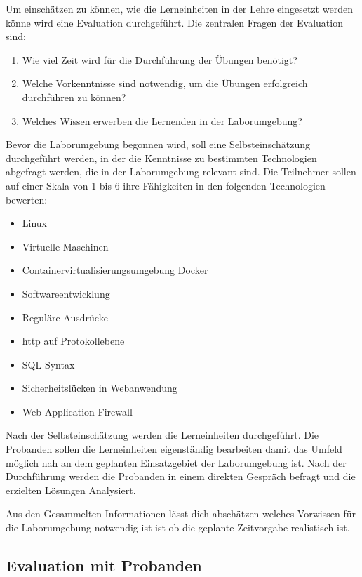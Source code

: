 Um einschätzen zu können, wie die Lerneinheiten in der Lehre eingesetzt werden könne wird eine Evaluation durchgeführt.
Die zentralen Fragen der Evaluation sind:
\begin{enumerate}
    \item Wie viel Zeit wird für die Durchführung der Übungen benötigt?
    \item Welche Vorkenntnisse sind notwendig, um die Übungen erfolgreich durchführen zu können?
    \item Welches Wissen erwerben die Lernenden in der Laborumgebung?
\end{enumerate}

Bevor die Laborumgebung begonnen wird, soll eine Selbsteinschätzung durchgeführt werden, in der die Kenntnisse zu bestimmten Technologien abgefragt werden, die in der Laborumgebung relevant sind.
Die Teilnehmer sollen auf einer Skala von 1 bis 6 ihre Fähigkeiten in den folgenden Technologien bewerten:

\begin{itemize}
    \item Linux
    \item Virtuelle Maschinen
    \item Containervirtualisierungsumgebung Docker
    \item Softwareentwicklung
    \item Reguläre Ausdrücke
    \item \ac{http} auf Protokollebene
    \item SQL-Syntax
    \item Sicherheitslücken in Webanwendung
    \item Web Application Firewall
\end{itemize}

Nach der Selbsteinschätzung werden die Lerneinheiten durchgeführt.
Die Probanden sollen die Lerneinheiten eigenständig bearbeiten damit das Umfeld möglich nah an dem geplanten Einsatzgebiet der Laborumgebung ist.
Nach der Durchführung werden die Probanden in einem direkten Gespräch befragt und die erzielten Lösungen Analysiert.

Aus den Gesammelten Informationen lässt dich abschätzen welches Vorwissen für die Laborumgebung notwendig ist ist ob die geplante Zeitvorgabe realistisch ist.

\subsection{Evaluation mit Probanden}

